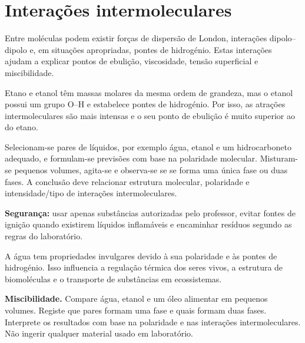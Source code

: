 \documentclass[11pt,a4paper,oneside]{book}
\begin{document}
\section{Interações intermoleculares}
Entre moléculas podem existir forças de dispersão de London, interações dipolo--dipolo e, em situações apropriadas, pontes de hidrogénio. Estas interações ajudam a explicar pontos de ebulição, viscosidade, tensão superficial e miscibilidade.

\begin{exemplo}[title=Exemplo resolvido -- forças intermoleculares]
Etano e etanol têm massas molares da mesma ordem de grandeza, mas o etanol possui um grupo O--H e estabelece pontes de hidrogénio. Por isso, as atrações intermoleculares são mais intensas e o seu ponto de ebulição é muito superior ao do etano.
\end{exemplo}

\begin{atividade}[title=AL 2.1 -- Miscibilidade de líquidos]
Selecionam-se pares de líquidos, por exemplo água, etanol e um hidrocarboneto adequado, e formulam-se previsões com base na polaridade molecular. Misturam-se pequenos volumes, agita-se e observa-se se se forma uma única fase ou duas fases. A conclusão deve relacionar estrutura molecular, polaridade e intensidade/tipo de interações intermoleculares.

\textbf{Segurança:} usar apenas substâncias autorizadas pelo professor, evitar fontes de ignição quando existirem líquidos inflamáveis e encaminhar resíduos segundo as regras do laboratório.
\end{atividade}

\begin{mundo}
A água tem propriedades invulgares devido à sua polaridade e às pontes de hidrogénio. Isso influencia a regulação térmica dos seres vivos, a estrutura de biomoléculas e o transporte de substâncias em ecossistemas.
\end{mundo}

\begin{atividade}[title=Extensão investigativa -- miscibilidade]
\textbf{Miscibilidade.} Compare água, etanol e um óleo alimentar em pequenos volumes. Registe que pares formam uma fase e quais formam duas fases. Interprete os resultados com base na polaridade e nas interações intermoleculares. Não ingerir qualquer material usado em laboratório.
\end{atividade}
\end{document}
